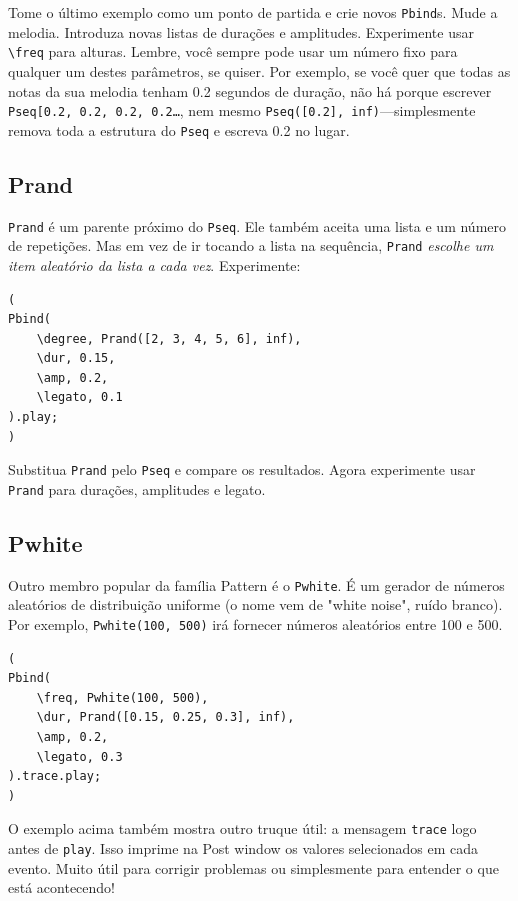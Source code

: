 Tome o último exemplo como um  ponto de partida e crie novos \texttt{Pbind}s. Mude a melodia. Introduza novas listas de durações e amplitudes. Experimente usar \texttt{\textbackslash freq} para alturas. Lembre, você sempre pode usar um número fixo para qualquer um destes parâmetros, se quiser. Por exemplo, se você quer que todas as notas da sua melodia tenham 0.2 segundos de duração, não há porque escrever \texttt{Pseq[0.2, 0.2, 0.2, 0.2\dots}, nem mesmo \texttt{Pseq([0.2], inf)}---simplesmente remova toda a estrutura do \texttt{Pseq} e escreva 0.2 no lugar.

\subsection{Prand}

\texttt{Prand} é um parente próximo do \texttt{Pseq}. Ele também aceita uma lista e um número de repetições. Mas em vez de ir tocando a lista na sequência, \texttt{Prand} \emph{escolhe um item aleatório da lista a cada vez}. Experimente:

 
\begin{lstlisting}[style=SuperCollider-IDE, basicstyle=\scttfamily\footnotesize]
(
Pbind(
	\degree, Prand([2, 3, 4, 5, 6], inf),
	\dur, 0.15,
	\amp, 0.2,
	\legato, 0.1
).play;
)
\end{lstlisting}
 

Substitua \texttt{Prand} pelo \texttt{Pseq} e compare os resultados. Agora experimente usar \texttt{Prand} para durações, amplitudes e legato.

\subsection{Pwhite}

Outro membro popular da família Pattern é o \texttt{Pwhite}. É um gerador de números aleatórios de distribuição uniforme (o nome vem de "white noise", ruído branco). Por exemplo, \texttt{Pwhite(100, 500)} irá fornecer números aleatórios entre 100 e 500.
 
\begin{lstlisting}[style=SuperCollider-IDE, basicstyle=\scttfamily\footnotesize]
(
Pbind(
	\freq, Pwhite(100, 500),
	\dur, Prand([0.15, 0.25, 0.3], inf),
	\amp, 0.2,
	\legato, 0.3
).trace.play;
)
\end{lstlisting}
 

O exemplo acima também mostra outro truque útil: a mensagem \texttt{trace} logo antes de \texttt{play}. Isso imprime na Post window os valores selecionados em cada evento. Muito útil para corrigir problemas ou simplesmente para entender o que está acontecendo!

